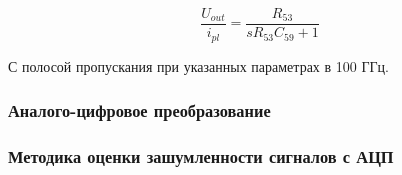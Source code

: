 $$
    \frac{ U_{out} }{ i_{pl} } = \frac{ R_{53} }{ s R_{53} C_{59} + 1 }
$$

С полосой пропускания при указанных параметрах в 100 ГГц.

\subsubsection{ Аналого-цифровое преобразование }

\subsubsection{ Методика оценки зашумленности сигналов с АЦП }

\endinput

